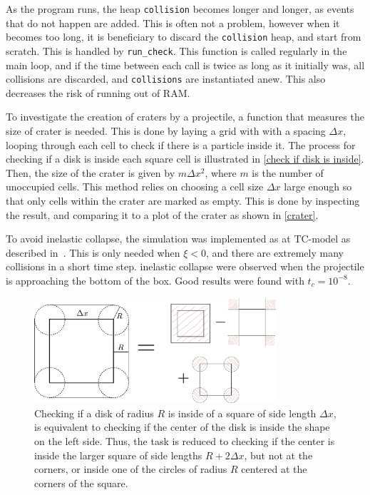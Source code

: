 \documentclass{article}
\begin{document}
    As the program runs, the heap \verb|collision| becomes longer and longer, as events that do not happen are added. This is often not a problem, however when it becomes too long, it is beneficiary to discard the \verb|collision| heap, and start from scratch. This is handled by \verb|run_check|. This function is called regularly in the main loop, and if the time between each call is twice as long as it initially was, all collisions are discarded, and \verb|collisions| are instantiated anew. This also decreases the risk of running out of RAM.

    To investigate the creation of craters by a projectile, a function that measures the size of crater is needed. This is done by laying a grid with with a spacing $\Delta x$, looping through each cell to check if there is a particle inside it. The process for checking if a disk is inside each square cell is illustrated in \autoref{check if disk is inside}. Then, the size of the crater is given by $m \Delta x^2$, where $m$ is the number of unoccupied cells. This method relies on choosing a cell size $\Delta x$ large enough so that only cells within the crater are marked as empty. This is done by inspecting the result, and comparing it to a plot of the crater as shown in \autoref{crater}.

    To avoid inelastic collapse, the simulation was implemented as at TC-model as described in~\cite{TC}. This is only needed when $\xi<0$, and there are extremely many collisions in a short time step. inelastic collapse were observed when the projectile is approaching the bottom of the box. Good results were found with $t_c = 10^{-8}$.

    \begin{figure}[H]
        \centering
        \includegraphics[width=0.8\textwidth]{figure.pdf}
        \caption{Checking if a disk of radius $R$ is inside of a square of side length $\Delta x$, is equivalent to checking if the center of the disk is inside the shape on the left side. Thus, the task is reduced to checking if the center is inside the larger square of side lengths $R + 2 \Delta x$, but not at the corners, or inside one of the circles of radius $R$ centered at the corners of the square.}
        \label{check if disk is inside}
    \end{figure}
\end{document}
